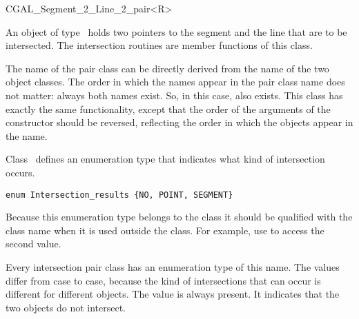 \begin{classtemplate}{CGAL_Segment_2_Line_2_pair<R>}


An object  of type \classname\ holds two pointers to the
segment and the line that are to be intersected. The intersection
routines are member functions of this class.

The name of the pair class can be directly derived from the name of
the two object classes. The order in which the names appear in the
pair class name does not matter: always both names exist. So, in this
case, also  exists. This class has
exactly the same functionality, except that the order of the
arguments of the constructor should be reversed, reflecting the order
in which the objects appear in the name.


\creation
{}


Class \classname\ defines an enumeration type that indicates what kind of
intersection occurs.
\begin{verbatim}
enum Intersection_results {NO, POINT, SEGMENT}
\end{verbatim}

Because this enumeration type belongs to the class it should be
qualified with the class name when it is used outside the class.  For
example, use  to access the second
value.

Every intersection pair class has an enumeration type of this name.
The values differ from case to case, because the kind of
intersections that can occur is different for different objects. The
value  is always present. It indicates that the two
objects do not intersect.

\operations




\end{classtemplate}
